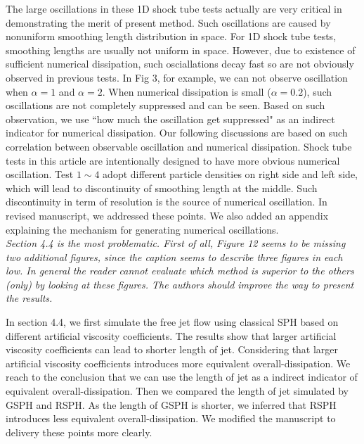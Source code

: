 \documentclass[10pt,a4paper]{article}
\begin{document}
The large oscillations in these 1D shock tube tests actually are very critical in demonstrating the merit of present method. Such oscillations are caused by nonuniform smoothing length distribution in space. For 1D shock tube tests, smoothing lengths are usually not uniform in space. However, due to existence of sufficient numerical dissipation, such osciallations decay fast so are not obviously observed in previous tests. In Fig 3, for example, we can not observe oscillation when $\alpha =1$ and $\alpha = 2$. When numerical dissipation is small ($\alpha = 0.2$), such oscillations are not completely suppressed and can be seen. Based on such observation, we use ``how much the oscillation get suppressed" as an indirect indicator for numerical dissipation. Our following discussions are based on such correlation between observable oscillation and numerical dissipation. Shock tube tests in this article are intentionally designed to have more obvious numerical oscillation. Test $1 \sim 4$ adopt different particle densities on right side and left side, which will lead to discontinuity of smoothing length at the middle. Such discontinuity in term of resolution is the source of numerical oscillation. In revised manuscript, we addressed these points. We also added an appendix explaining the mechanism for generating numerical oscillations.
\\[3pt]

\textit{Section 4.4 is the most problematic. First of all, Figure 12 seems to be missing two additional figures, since the caption seems to describe three figures in each low. In general the reader cannot evaluate which method is superior to the others (only) by looking at these figures. The authors should improve the way to present the results.} 

In section 4.4, we first simulate the free jet flow using classical SPH based on different artificial viscosity coefficients. The results show that larger artificial viscosity coefficients can lead to shorter length of jet. Considering that larger artificial viscosity coefficients introduces more equivalent overall-dissipation. We reach to the conclusion that we can use the length of jet as a indirect indicator of equivalent overall-dissipation. 
Then we compared the length of jet simulated by GSPH and RSPH. As the length of GSPH is shorter, we inferred that RSPH introduces less equivalent overall-dissipation.
We modified the manuscript to delivery these points more clearly.
 
\end{document}
